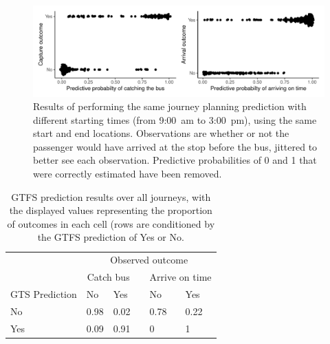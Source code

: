 \begin{knitrout}\small
{}\color{fgcolor}\begin{figure}

{\centering \includegraphics[width=\textwidth]{figure/eta_journey_results_avg-1} 

}

\caption[Results of performing the same journey planning prediction with different starting times (from  9:00~am to  3:00~pm), using the same start and end locations]{Results of performing the same journey planning prediction with different starting times (from  9:00~am to  3:00~pm), using the same start and end locations. Observations are whether or not the passenger would have arrived at the stop before the bus, jittered to better see each observation. Predictive probabilities of 0 and 1 that were correctly estimated have been removed.}\label{fig:eta_journey_results_avg}
\end{figure}

\begin{table}

\caption{\label{tab:eta_journey_results_avg}GTFS prediction results over all journeys, with the displayed values representing the proportion of outcomes in each cell (rows are conditioned by the GTFS prediction of Yes or No. }
\centering
\fontsize{8}{10}\selectfont
\begin{tabular}[t]{llllll}
\toprule
\multicolumn{1}{c}{} & \multicolumn{5}{c}{Observed outcome} \\
\cmidrule(l{3pt}r{3pt}){2-6}
\multicolumn{1}{c}{ } & \multicolumn{2}{c}{Catch bus} & \multicolumn{1}{c}{} & \multicolumn{2}{c}{Arrive on time} \\
\cmidrule(l{3pt}r{3pt}){2-3} \cmidrule(l{3pt}r{3pt}){5-6}
GTS Prediction & No & Yes &  & No & Yes\\
\midrule
No & 0.98 & 0.02 &  & 0.78 & 0.22\\
Yes & 0.09 & 0.91 &  & 0 & 1\\
\bottomrule
\end{tabular}
\end{table}


\end{knitrout}


